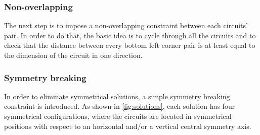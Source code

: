 \documentclass[a4paper, 12pt]{article}
\begin{document}
\subsubsection{Non-overlapping}

The next step is to impose a non-overlapping constraint between each circuits' pair. In order to do that, the basic idea is to cycle through all the circuits and to check that the distance between every bottom left corner pair is at least equal to the dimension of the circuit in one direction.


\subsubsection{Symmetry breaking}\label{sec:symmetry}

In order to eliminate symmetrical solutions, a simple symmetry breaking constraint is introduced. As shown in \cref{fig:solutions}, each solution has four symmetrical configurations, where the circuits are located in symmetrical positions with respect to an horizontal and/or a vertical central symmetry axis.
\end{document}
